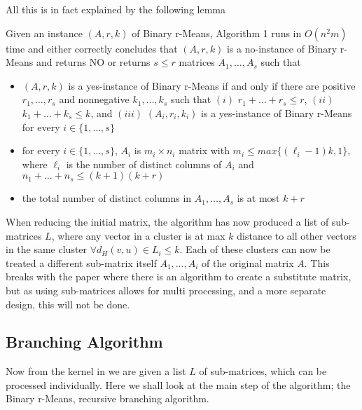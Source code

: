 \documentclass[a4paper]{article}
\begin{document}
All this is in fact explained by the following lemma
\setcounter{theoremlemma}{4}
\begin{theoremlemma}
    Given an instance $(A,r,k)$ of Binary r-Means, Algorithm 1 runs in $O(n^2m)$ time
    and either correctly concludes that $(A,r,k)$ is a no-instance of Binary r-Means and
    returns NO or returns $s \leq r$ matrices $A_1, \dots, A_s$ such that
    \begin{itemize}
        \item $(A,r,k)$ is a yes-instance of Binary r-Means if and only if there are positive
              $r_1,\dots,r_s$ and nonnegative $k_1,\dots,k_s$ such that $(i)$ $r_1 + \dots + r_s \leq r$,
              $(ii)$ $k_1 + \dots + k_s \leq k$, and $(iii)$ $(A_i,r_i,k_i)$ is a yes-instance of Binary
              r-Means for every $i\in\{1,\dots,s\}$
        \item for every $i\in\{1,\dots,s\}$, $A_i$ is $m_i \times n_i$ matrix with
              $m_i \leq max\{(\ell_i - 1)k, 1\}$, where $\ell_i$ is the number of distinct columns
              of $A_i$ and $n_1 + \dots + n_s \leq (k+1)(k+r)$
        \item the total number of distinct columns in $A_1,\dots,A_s$ is at most $k+r$
    \end{itemize}
    \cite[Lemma 5]{fomin_golovach_panolan_2020}
    \label{lem:5}
\end{theoremlemma}





When reducing the initial matrix, the algorithm has now produced a list of sub-matrices $L$, where any vector
in a cluster is at max $k$ distance to all other vectors in the same cluster $\forall d_H(v, u) \in L_i \leq k$.
Each of these clusters can now be treated a different sub-matrix itself $A_1, \dots, A_i$ of the original matrix $A$.
This breaks with the paper \cite{fomin_golovach_panolan_2020} where there is an algorithm to create a substitute matrix,
but as using sub-matrices allows for multi processing, and a more separate design, this will not be done.

\subsection{Branching Algorithm}
Now from the kernel in  we are given a list $L$ of sub-matrices, which can be processed individually. Here we
shall look at the main step of the algorithm; the Binary r-Means, recursive branching algorithm.
\end{document}
